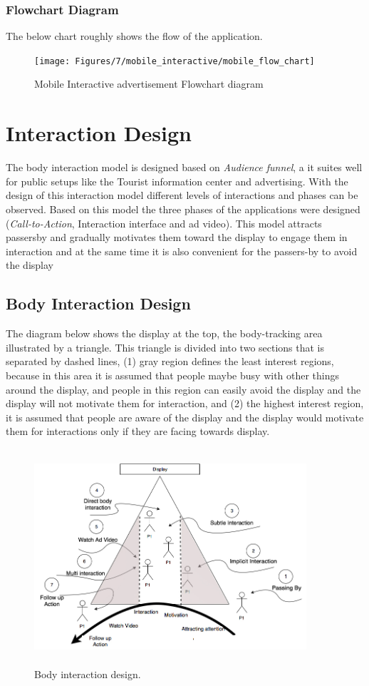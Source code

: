 \subsubsection{Flowchart Diagram}
The below chart roughly shows the flow of the application.
\begin{figure}[H]
    \centering
    \texttt{[image: Figures/7/mobile\_interactive/mobile\_flow\_chart]}
    \caption{Mobile Interactive advertisement Flowchart diagram}%
    \label{fig:mobile_flowchat}%
\end{figure}
\fi

\section{Interaction Design}
The body interaction model is designed based on \emph{Audience funnel},  a it suites well for public setups like the Tourist information center and advertising. With the design of this interaction model different levels of interactions and phases can be observed. Based on this model the three phases of the applications were designed (\emph{Call-to-Action}, Interaction interface and ad video). This model attracts passersby and gradually motivates them toward the display to engage them in interaction and at the same time it is also convenient for the passers-by to avoid the display


\subsection{Body Interaction Design}
The diagram below shows the display at the top, the body-tracking area illustrated by a triangle. This triangle is divided into two sections that is separated by dashed lines, (1) gray region defines the least interest regions, because in this area it is assumed that people maybe busy with other things around the display, and people in this region can easily avoid the display and the display will not motivate them for interaction, and (2) the highest interest region, it is assumed that people are aware of the display and the display would motivate them for interactions only if they are facing towards display.


\begin{figure}[H]
    \centering
    \includegraphics[width=0.9\textwidth,height=8cm]{Figures/7/body_interaction_model}
    \caption{Body interaction design.}%
    \label{fig:body_interaction_deisng}%
\end{figure}


